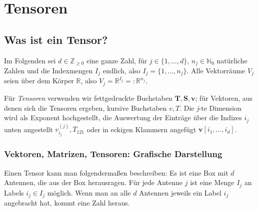 \documentclass[11pt]{article} %
\begin{document}

	\maketitle

	\newpage

	\tableofcontents

	\newpage


\section{Tensoren}

\subsection{Was ist ein Tensor?}

Im Folgenden sei $d \in \mathbb{Z}_{\geq 0}$ eine ganze Zahl, für $j \in \{1,\dots , d \}$, $n_{j} \in \mathbb{N}_{0}$
 natürliche Zahlen
und die Indexmengen $I_{j}$ endlich, also $I_{j} = \{1,\dots , n_{j} \}$. Alle Vektorräume $V_{j}$ seien über dem Körper $\mathbb{R}$,
also $V_{j} = \mathbb{R}^{I_{j}} =: \mathbb{R}^{n_{j}}$.

Für \textit{Tensoren} verwenden wir fettgedruckte Buchstaben $\mathbf{T}, \mathbf{S}, \mathbf{v}$; für Vektoren, aus
 denen sich die
Tensoren ergeben, kursive Buchstaben $v, T$. Die \textit{j}-te Dimension wird als Exponent hochgestellt, die Auswertung der
Einträge über die Indizes $i_{j}$ unten angestellt $v^{(j)}_{i_{j}}, T_{121}$ oder in eckigen Klammern angefügt $\mathbf{v}[i_{1},\dots,i_{d}]$.

%
\subsubsection{Vektoren, Matrizen, Tensoren: Grafische Darstellung \cite{tensor_networs_simons}}
\begin{changemargin}{0pt}{0pt}

Einen Tensor kann man folgendermaßen beschreiben: Es ist eine Box mit $d$ Antennen, die aus der Box herausragen.
Für jede Antenne $j$ ist eine Menge $I_{j}$ an Labels $i_{j} \in I_{j}$ möglich.
Wenn man an alle $d$ Antennen jeweils ein Label $i_{j}$ angebracht hat, kommt eine Zahl heraus.
\end{changemargin}
\end{document}
